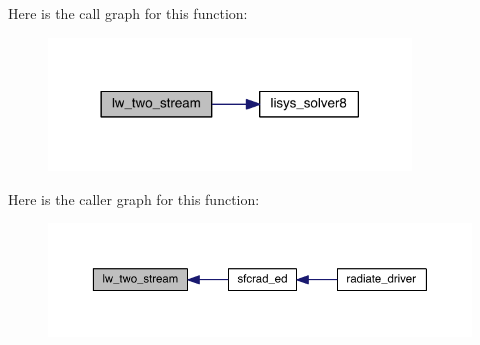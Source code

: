 Here is the call graph for this function\+:\nopagebreak
\begin{figure}[H]
\begin{center}
\leavevmode
\includegraphics[width=273pt]{twostream__rad_8f90_a6581b5d4ea4bd5a6c7a8e742257dd0d1_cgraph}
\end{center}
\end{figure}




Here is the caller graph for this function\+:\nopagebreak
\begin{figure}[H]
\begin{center}
\leavevmode
\includegraphics[width=350pt]{twostream__rad_8f90_a6581b5d4ea4bd5a6c7a8e742257dd0d1_icgraph}
\end{center}
\end{figure}


\hypertarget{twostream__rad_8f90_abe93885fe642dcef8db1fb3977179585}{}
